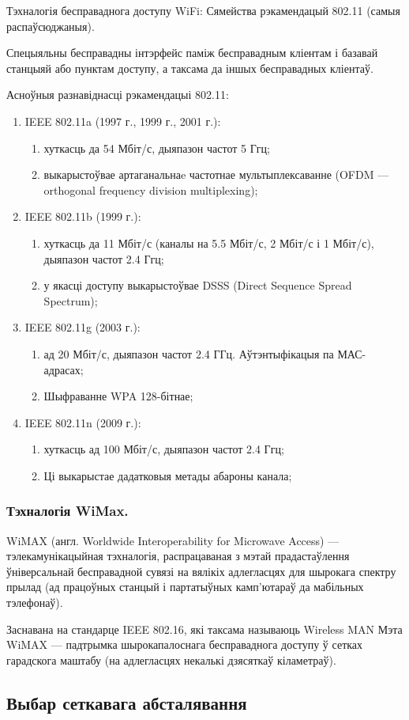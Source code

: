 Тэхналогія бесправаднога доступу WiFi: Сямейства рэкамендацый 802.11 (самыя распаўсюджаныя).

Спецыяльны бесправадны інтэрфейс паміж бесправадным кліентам і базавай станцыяй або пунктам доступу, а таксама да іншых бесправадных кліентаў.

Асноўныя разнавіднасці рэкамендацыі 802.11:
\begin{enumerate}
    \item IEEE 802.11a (1997 г., 1999 г., 2001 г.):
    \begin{enumerate}
        \item хуткасць да 54 Мбіт/с, дыяпазон частот 5 Ггц;
        \item выкарыстоўвае  артаганальнаe частотнае мультыплексаванне (OFDM --- orthogonal frequency division multiplexing);
    \end{enumerate}
    \item IEEE 802.11b (1999 г.):
    \begin{enumerate}
        \item хуткасць да 11 Мбіт/с (каналы на 5.5 Мбіт/с, 2 Мбіт/с і 1 Мбіт/с), дыяпазон частот 2.4 Ггц;
        \item у якасці доступу выкарыстоўвае DSSS (Direct Sequence Spread Spectrum);
    \end{enumerate}
    \item IEEE 802.11g (2003 г.):
    \begin{enumerate}
        \item ад 20 Мбіт/с, дыяпазон частот 2.4 ГГц. Аўтэнтыфікацыя па МАС-адрасах;
        \item Шыфраванне WPA 128-бітнае;
    \end{enumerate}
    \item IEEE 802.11n (2009 г.):
    \begin{enumerate}
        \item хуткасць ад 100 Мбіт/с, дыяпазон частот 2.4 Ггц;
        \item Ці выкарыстае дадатковыя метады абароны канала;
    \end{enumerate}
\end{enumerate}

\subsubsection{Тэхналогія WiMax.}

WiMAX (англ. Worldwide Interoperability for Microwave Access) --- тэлекамунікацыйная тэхналогія, распрацаваная з мэтай прадастаўлення ўніверсальнай бесправадной сувязі на вялікіх адлегласцях для шырокага спектру прылад (ад працоўных станцый і партатыўных камп'ютараў да мабільных тэлефонаў).

Заснавана на стандарце IEEE 802.16, які таксама называюць Wireless MAN
Мэта WiMAX --- падтрымка шырокапалоснага бесправаднога доступу ў сетках гарадскога маштабу (на адлегласцях некалькі дзясяткаў кіламетраў).

\subsection{Выбар сеткавага абсталявання}
